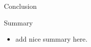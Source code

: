 \documentclass[c]{beamer}
\begin{document}

\begin{frame}{Conclusion}
	\begin{block}{Summary}
		\begin{itemize}
			\item add nice summary here.
		\end{itemize}
	\end{block}
\end{frame}
\end{document}
